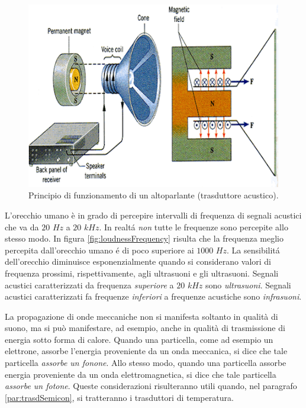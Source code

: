 \documentclass[17pt]{extarticle}
\begin{document}
\begin{figure}[t]
	\centering
   	\includegraphics[width=4.4in]{speakerMagneticField.png}%
  	\caption{Principio di funzionamento di un altoparlante (trasduttore acustico).}
   	\label{fig:trasduttoreSuono}
\end{figure}




L'orecchio umano è in grado di percepire intervalli di frequenza di segnali acustici che va da $20$ $Hz$ a $20$ $kHz$. In realt\'a \emph{non} tutte le frequenze sono percepite allo stesso modo. In figura \ref{fig:loudnessFrequency} risulta che la frequenza meglio percepita dall'orecchio umano \'e di poco superiore ai $1000$ $Hz$. La sensibilit\'a dell'orecchio diminuisce esponenzialmente quando si considerano valori di frequenza prossimi, rispettivamente, agli ultrasuoni e gli ultrasuoni. Segnali acustici caratterizzati da frequenza \emph{superiore} a $20$ $kHz$ sono \emph{ultrasuoni}. Segnali acustici caratterizzati fa frequenze \emph{inferiori} a frequenze acustiche sono \emph{infrasuoni}. 


La propagazione di onde meccaniche non si manifesta soltanto in qualità di suono, ma si può manifestare, ad esempio, anche in qualità di trasmissione di energia sotto forma di calore.
Quando una particella, come ad esempio un elettrone, assorbe l'energia proveniente da un onda meccanica, si dice che tale particella \emph{assorbe un fonone}. Allo stesso modo, quando una particella assorbe energia proveniente da un onda elettromagnetica, si dice che tale particella \emph{assorbe un fotone}. 
Queste considerazioni risulteranno utili quando, nel paragrafo \ref{par:trasdSemicon}, si tratteranno i trasduttori di temperatura.
\end{document}
